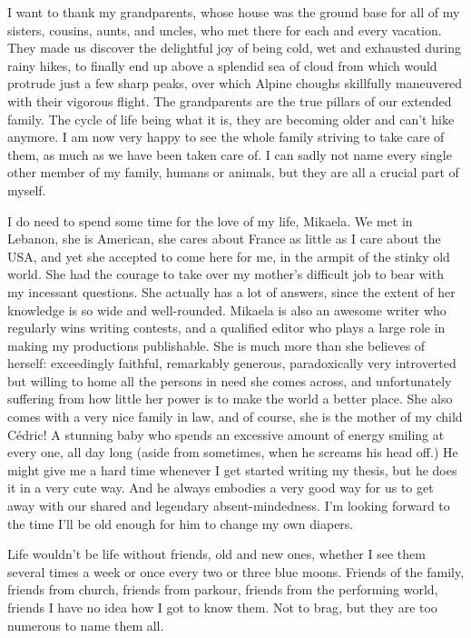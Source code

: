 I want to thank my grandparents, whose house was the ground base for all of my sisters, cousins, aunts, and uncles, who met there for each and every vacation. They made us discover the delightful joy of being cold, wet and exhausted during rainy hikes, to finally end up above a splendid sea of cloud from which would protrude just a few sharp peaks, over which Alpine choughs skillfully maneuvered with their vigorous flight. The grandparents are the true pillars of our extended family. The cycle of life being what it is, they are becoming older and can't hike anymore. I am now very happy to see the whole family striving to take care of them, as much as we have been taken care of. I can sadly not name every single other member of my family, humans or animals, but they are all a crucial part of myself. 

I do need to spend some time for the love of my life, Mikaela. We met in Lebanon, she is American, she cares about France as little as I care about the USA, and yet she accepted to come here for me, in the armpit of the stinky old world. She had the courage to take over my mother's difficult job to bear with my incessant questions. She actually has a lot of answers, since the extent of her knowledge is so wide and well-rounded. Mikaela is also an awesome writer who regularly wins writing contests, and a qualified editor who plays a large role in making my productions publishable. She is much more than she believes of herself: exceedingly faithful, remarkably generous, paradoxically very introverted but willing to home all the persons in need she comes across, and unfortunately suffering from how little her power is to make the world a better place. She also comes with a very nice family in law, and of course, she is the mother of my child Cédric! A stunning baby who spends an excessive amount of energy smiling at every one, all day long (aside from sometimes, when he screams his head off.) He might give me a hard time whenever I get started writing my thesis, but he does it in a very cute way. And he always embodies a very good way for us to get away with our shared and legendary absent-mindedness. I'm looking forward to the time I'll be old enough for him to change my own diapers.

Life wouldn't be life without friends, old and new ones, whether I see them several times a week or once every two or three blue moons. Friends of the family, friends from church, friends from parkour, friends from the performing world, friends I have no idea how I got to know them. Not to brag, but they are too numerous to name them all. 


